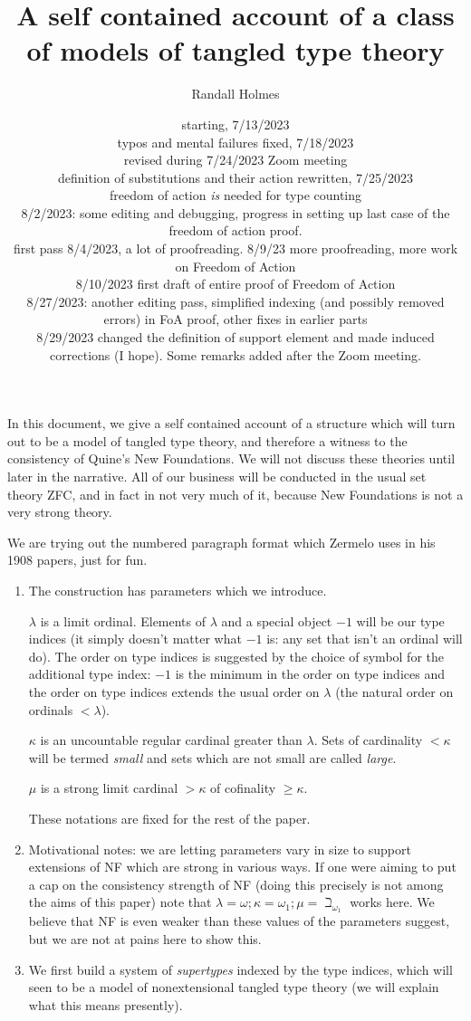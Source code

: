\documentclass[12pt]{article}
\title{A self contained account of a class of models of tangled type theory}
\author{Randall Holmes}
\date{starting, 7/13/2023\\
typos and mental failures fixed, 7/18/2023\\
revised during 7/24/2023 Zoom meeting\\definition of substitutions and their action rewritten, 7/25/2023\\
freedom of action {\em is} needed for type counting\\
8/2/2023:  some editing and debugging, progress in setting up last case of the freedom of action proof.\\
first pass 8/4/2023, a lot of proofreading.
8/9/23 more proofreading, more work on Freedom of Action\\
8/10/2023 first draft of entire proof of Freedom of Action\\
8/27/2023:  another editing pass, simplified indexing (and possibly removed errors) in FoA proof, other fixes in earlier parts\\
8/29/2023 changed the definition of support element and made induced corrections (I hope).  Some remarks added after the Zoom meeting.}
\begin{document}
\maketitle

\newpage

In this document, we give a self contained account of a structure which will turn out to be a model of tangled type theory, and therefore a witness to the consistency of Quine's New Foundations.
We will not discuss these theories until later in the narrative.  All of our business will be conducted in the usual set theory ZFC, and in fact in not very much of it, because New Foundations is not a very strong theory.

We are trying out the numbered paragraph format which Zermelo uses in his 1908 papers, just for fun.

\begin{enumerate}

\item The construction has parameters which we introduce.

$\lambda$ is a limit ordinal.  Elements of $\lambda$ and a special object $-1$ will be our type indices (it simply doesn't matter what $-1$ is:  any set that isn't an ordinal will do).  The order on type indices is suggested by the choice of symbol for the additional type index:  $-1$ is the minimum in the order on type indices and the order on type indices extends the usual order on $\lambda$ (the natural order on ordinals $<\lambda$).

$\kappa$ is an uncountable regular cardinal greater than $\lambda$.  Sets of cardinality $<\kappa$ will be termed {\em small\/} and sets which are not small are called {\em large\/}.

$\mu$ is a strong limit cardinal $>\kappa$ of cofinality $\geq \kappa$.

These notations are fixed for the rest of the paper.

\item  Motivational notes:  we are letting parameters vary in size to support extensions of NF which are strong in various ways.  If one were aiming to put a cap on the consistency strength of NF (doing this precisely is not among the aims of this paper) note that $\lambda = \omega; \kappa = \omega_1; \mu = \beth_{\omega_1}$ works here.  We believe that NF is even weaker than these values of the parameters suggest, but we are not at pains here to show this.

\item We first build a system of {\em supertypes\/} indexed by the type indices, which will seen to be a model of nonextensional tangled type theory (we will explain what this means presently).


\end{enumerate}
\end{document}
